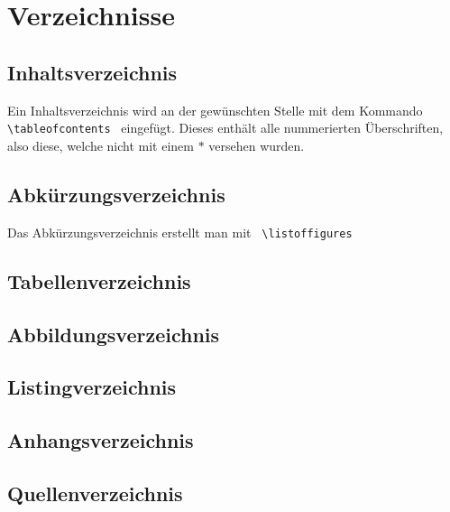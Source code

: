 \section{Verzeichnisse}
\subsection{Inhaltsverzeichnis}
Ein Inhaltsverzeichnis wird an der gewünschten Stelle mit dem Kommando 
\lstinline$ \tableofcontents $ eingefügt. Dieses enthält alle nummerierten 
Überschriften, also diese, welche nicht mit einem $*$ versehen wurden.
\subsection{Abkürzungsverzeichnis}
Das Abkürzungsverzeichnis erstellt man mit \lstinline$ \listoffigures $
\subsection{Tabellenverzeichnis}
\subsection{Abbildungsverzeichnis}
\subsection{Listingverzeichnis}
\subsection{Anhangsverzeichnis}
\subsection{Quellenverzeichnis}



\listoftables %
\lstlistoflistings %